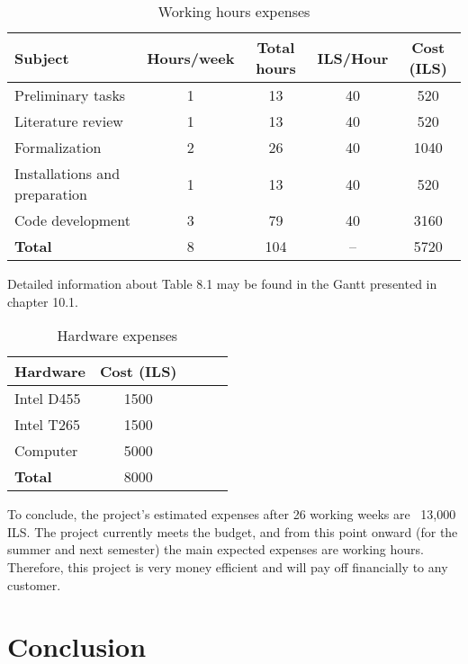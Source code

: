 \documentclass[12pt,a4paper,oneside,onecolumn]{book}
\begin{document}
\begin{table}[ht]
\centering
\caption{Working hours expenses}
\label{tab:work_hours}
\begin{tabular}{@{}lcccc@{}}
\toprule
Subject                        & Hours/week & Total hours & ILS/Hour & Cost (ILS) \\ \midrule
Preliminary tasks              & 1          & 13          & 40      & 520       \\
Literature review              & 1          & 13          & 40      & 520      \\
Formalization                  & 2          & 26          & 40      & 1040       \\
Installations and preparation  & 1          & 13          & 40      & 520       \\
Code development               & 3          & 79          & 40      & 3160      \\ \midrule
\textbf{Total}                 & 8          & 104         & --      & 5720      \\ \bottomrule
\end{tabular}
\end{table}


Detailed information about Table 8.1 may be found in the Gantt presented in chapter
10.1.

\begin{table}[ht]
\centering
\caption{Hardware expenses}
\label{tab:work_hours}
\begin{tabular}{@{}lcccc@{}}
\toprule
Hardware                        & Cost (ILS) \\ \midrule
Intel D455              & 1500                \\
Intel T265              & 1500              \\
Computer                  & 5000                 \\
\textbf{Total}                 & 8000                \\ \bottomrule
\end{tabular}
\end{table}

To conclude, the project’s estimated expenses after 26 working weeks are ~13,000 ILS.
The project currently meets the budget, and from this point onward (for the summer
and next semester) the main expected expenses are working hours. Therefore, this
project is very money efficient and will pay off financially to any customer.


\chapter{Conclusion}
\label{chapter:conclusion}
\end{document}
